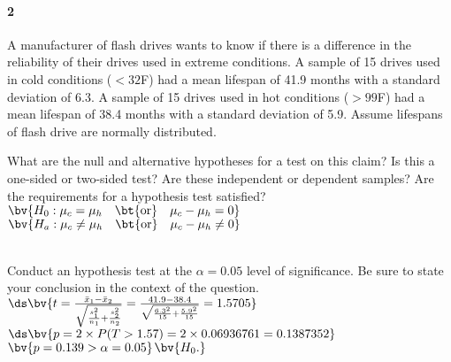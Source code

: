 \documentclass{article}
\begin{document}
\begin{flushleft}
\begin{enumalpha}
\end{enumalpha}

\newpage
\paragraph{2} A manufacturer of flash drives wants to know if there is a difference in the reliability of their drives used in extreme conditions. A sample of 15 drives used in cold conditions ($< 32 $\textdegree F) had a mean lifespan of 41.9 months with a standard deviation of 6.3. A sample of 15 drives used in hot conditions ($> 99 $\textdegree F) had a mean lifespan of 38.4 months with a standard deviation of 5.9. Assume lifespans of flash drive are normally distributed.
\begin{enumalpha}
\item What are the null and alternative hypotheses for a test on this claim? Is this a one-sided or two-sided test? Are these independent or dependent samples? Are the requirements for a hypothesis test satisfied?\\
\medskip
$\bv{H_0: \mu_c = \mu_h \quad \text{\bt{or}} \quad \mu_c - \mu_h = 0}$ \\
$\bv{H_a: \mu_c \ne \mu_h \quad \text{\bt{or}} \quad \mu_c - \mu_h \ne 0}$ \\
\\
\vspace{.5in}

\vspace{2.25in}
\item Conduct an hypothesis test at the $\alpha = 0.05$ level of significance. Be sure to state your conclusion in the context of the question.\\
\medskip
$\ds\bv{t = \frac{\bar x_1 - \bar x_2}{\sqrt{\frac{s_1^2}{n_1} + \frac{s_2^2}{n_2}}} = \frac{41.9 - 38.4}{\sqrt{\frac{6.3^2}{15} + \frac{5.9^2}{15}}} = 1.5705}$\\
$\ds\bv{p = 2 \times P(T > 1.57) = 2 \times 0.06936761 = 0.1387352}$\\ \medskip
$\bv{p = 0.139 > \alpha =0.05}$$\bv{H_0.}$\\
\vspace{.5in}

\end{enumalpha}


\end{flushleft}
\end{document}
